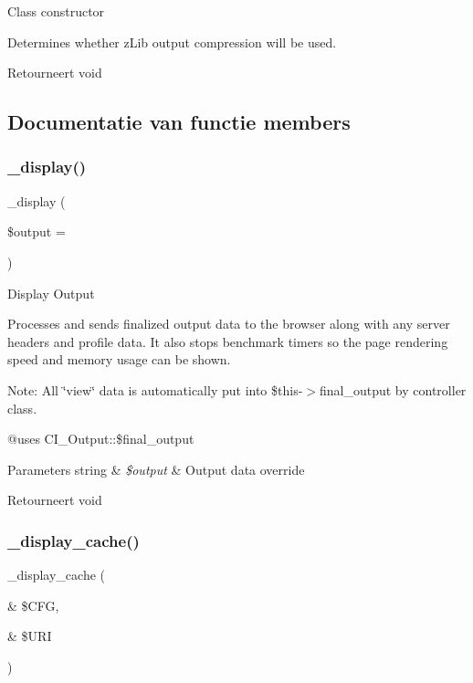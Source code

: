 Class constructor

Determines whether z\+Lib output compression will be used.

\begin{DoxyReturn}{Retourneert}
void 
\end{DoxyReturn}


\subsection{Documentatie van functie members}
\mbox{\label{class_c_i___output_acc6949872b39347a6314db4bc8c45c50}} 
\subsubsection{\texorpdfstring{\_display()}{\_display()}}
{\footnotesize\ttfamily \+\_\+display (\begin{DoxyParamCaption}\item[{}]{\$output = {\ttfamily \textquotesingle{}\textquotesingle{}} }\end{DoxyParamCaption})}

Display Output

Processes and sends finalized output data to the browser along with any server headers and profile data. It also stops benchmark timers so the page rendering speed and memory usage can be shown.

Note\+: All \char`\"{}view\char`\"{} data is automatically put into \$this-\/$>$final\+\_\+output by controller class.

@uses C\+I\+\_\+\+Output\+::\$final\+\_\+output 
\begin{DoxyParams}[1]{Parameters}
string & {\em \$output} & Output data override \\
\hline
\end{DoxyParams}
\begin{DoxyReturn}{Retourneert}
void 
\end{DoxyReturn}
\mbox{\label{class_c_i___output_acce78bdac02df9ab196a9c5939f6c4ab}} 
\subsubsection{\texorpdfstring{\_display\_cache()}{\_display\_cache()}}
{\footnotesize\ttfamily \+\_\+display\+\_\+cache (\begin{DoxyParamCaption}\item[{\&}]{\$\+C\+FG,  }\item[{\&}]{\$\+U\+RI }\end{DoxyParamCaption})}

